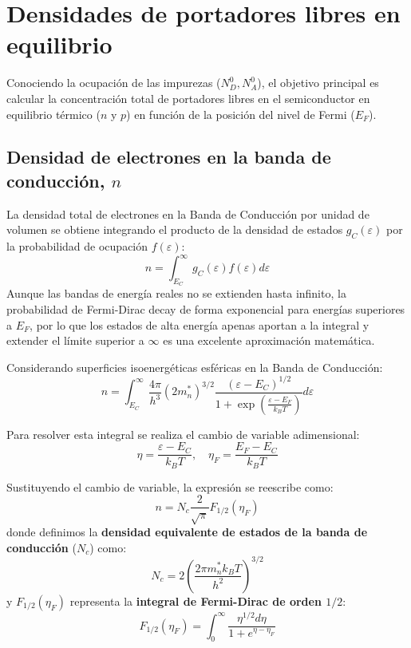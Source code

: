 \newpage


\section{Densidades de portadores libres en equilibrio}

Conociendo la ocupación de las impurezas ($N_D^0, N_A^0$), el objetivo principal es calcular la concentración total de portadores libres en el semiconductor en equilibrio térmico ($n$ y $p$) en función de la posición del nivel de Fermi ($E_F$).

\subsection{Densidad de electrones en la banda de conducción, \texorpdfstring{$n$}{n}}

La densidad total de electrones en la Banda de Conducción por unidad de volumen se obtiene integrando el producto de la densidad de estados $g_C(\varepsilon)$ por la probabilidad de ocupación $f(\varepsilon)$:
\[
n = \int_{E_C}^{\infty} g_C(\varepsilon) f(\varepsilon) d\varepsilon
\]
Aunque las bandas de energía reales no se extienden hasta infinito, la probabilidad de Fermi-Dirac decay de forma exponencial para energías superiores a $E_F$, por lo que los estados de alta energía apenas aportan a la integral y extender el límite superior a $\infty$ es una excelente aproximación matemática.

Considerando superficies isoenergéticas esféricas en la Banda de Conducción:
\[
n = \int_{E_C}^{\infty} \frac{4\pi}{h^3} (2m_n^*)^{3/2} \frac{(\varepsilon - E_C)^{1/2}}{1 + \exp\left( \frac{\varepsilon - E_F}{k_B T} \right)} d\varepsilon
\]

Para resolver esta integral se realiza el cambio de variable adimensional:
\[
\eta = \frac{\varepsilon - E_C}{k_B T}, \quad \eta_F = \frac{E_F - E_C}{k_B T}
\]

Sustituyendo el cambio de variable, la expresión se reescribe como:
\[
n = N_c \frac{2}{\sqrt{\pi}} F_{1/2}(\eta_F)
\]
donde definimos la \textbf{densidad equivalente de estados de la banda de conducción} ($N_c$) como:
\[
N_c = 2 \left( \frac{2\pi m_n^* k_B T}{h^2} \right)^{3/2}
\]
y $F_{1/2}(\eta_F)$ representa la \textbf{integral de Fermi-Dirac de orden $1/2$}:
\[
F_{1/2}(\eta_F) = \int_0^{\infty} \frac{\eta^{1/2} d\eta}{1 + e^{\eta - \eta_F}}
\]

